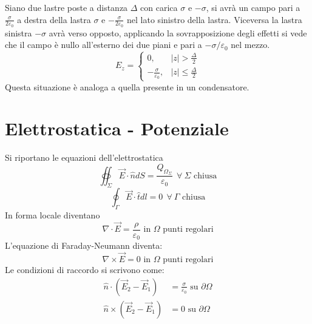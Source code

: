 Siano due lastre poste a distanza $\Delta$ con carica $\sigma$ e $-\sigma$,
si avrà un campo pari a $\frac{\sigma}{2\varepsilon_0}$ a destra della
lastra $\sigma$ e $-\frac{\sigma}{2\varepsilon_0}$ nel lato sinistro della lastra.
Viceversa la lastra sinistra $-\sigma$ avrà verso opposto, applicando la sovrapposizione degli 
effetti si vede che il campo è nullo all'esterno dei due piani e pari a $-\sigma/\varepsilon_0$ 
nel mezzo.
$$
E_z = \begin{cases}
0, & |z| > \frac{\Delta}{2}\\
-\frac{\sigma}{\varepsilon_0}, & |z| \leq \frac{\Delta}{2}
\end{cases}
$$
Questa situazione è analoga a quella presente in un condensatore.

\section{Elettrostatica - Potenziale}
Si riportano le equazioni dell'elettrostatica
$$
\oiint_\Sigma \vec{E}\cdot\hat{n} dS = \frac{Q_{\Omega_\Sigma}}{\varepsilon_0}\ \ \forall\ \Sigma \text{ chiusa}
$$
$$
\oint_\Gamma \vec{E}\cdot\hat{t} dl =0\ \ \forall\ \Gamma \text{ chiusa}
$$
In forma locale diventano
$$
\nabla\cdot\vec{E} = \frac{\rho}{\varepsilon_0} \text{ in } \Omega \text{ punti regolari}
$$
L'equazione di Faraday-Neumann diventa:
$$
\nabla \times \vec{E} = 0 \text{ in } \Omega \text{ punti regolari}
$$
Le condizioni di raccordo si scrivono come:
$$
\begin{aligned}
\hat{n}\cdot (\vec{E}_2 - \vec{E}_1) &= \frac{\sigma}{\varepsilon_0} \text{ su } \partial\Omega\\
\hat{n}\times (\vec{E}_2 - \vec{E}_1) &= 0 \text{ su } \partial\Omega
\end{aligned}
$$

